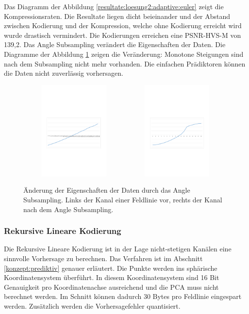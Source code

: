 Das Diagramm der Abbildung \ref{resultate:loesung2:adaptive:euler} zeigt die Kompressionsraten. Die Resultate liegen dicht beieinander und der Abstand zwischen Kodierung und der Kompression, welche ohne Kodierung erreicht wird wurde drastisch vermindert. Die Kodierungen erreichen eine PSNR-HVS-M von 139,2. Das Angle Subsampling verändert die Eigenschaften der Daten. Die Diagramme der Abbildung \ref{resultate:loesung2:adaptive:channel} zeigen die Veränderung: Monotone Steigungen sind nach dem Subsampling nicht mehr vorhanden. Die einfachen Prädiktoren können die Daten nicht zuverlässig vorhersagen.

\begin{figure}[!htbp]
	\center
	\includegraphics[trim = 1.8cm 9.5cm 1.8cm 11cm, clip=true,
width=0.49\textwidth,height=5cm,keepaspectratio]{./pictures/resultate/loesung2/variante1/channel_euler.pdf}
	\includegraphics[trim = 1.8cm 9.5cm 1.8cm 11cm, clip=true,
width=0.49\textwidth,height=5cm,keepaspectratio]{./pictures/resultate/loesung2/variante1/channel_angle.pdf}
	\caption{Änderung der Eigenschaften der Daten durch das Angle Subsampling. Links der Kanal einer Feldlinie vor, rechts der Kanal nach dem Angle Subsampling.}
	\label{resultate:loesung2:adaptive:channel}
\end{figure}

\subsubsection{Rekursive Lineare Kodierung} \label{resultate:loesung2:wavelet}
Die Rekursive Lineare Kodierung ist in der Lage nicht-stetigen Kanälen eine sinnvolle Vorhersage zu berechnen. Das Verfahren ist im Abschnitt \ref{konzept:prediktiv} genauer erläutert. Die Punkte werden ins sphärische Koordinatensystem überführt. In diesem Koordinatensystem sind 16 Bit Genauigkeit pro Koordinatenachse ausreichend und die PCA muss nicht berechnet werden. Im Schnitt können dadurch 30 Bytes pro Feldlinie eingespart werden. Zusätzlich werden die Vorhersagefehler quantisiert.

